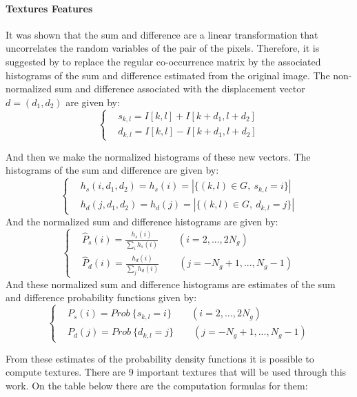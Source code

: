 \paragraph{Textures Features}
It was shown that the sum and difference are a linear transformation that uncorrelates the random variables of the pair of the pixels. Therefore, it is suggested by \cite{Unser} to replace the regular co-occurrence matrix by the associated histograms of the sum and difference estimated from the original image.
The non-normalized sum and difference associated with the displacement vector $d=(d_1,d_2)$ are given by:
\begin{equation}
\begin{cases}
&s_{k,l} = I[k,l] + I[k+d_1, l+d_2]\\
&d_{k,l} = I[k,l] - I[k+d_1, l+d_2]
\end{cases}
\end{equation}

And then we make the normalized histograms of these new vectors. The histograms of the sum and difference are given by:
\begin{equation}
\begin{cases}
&h_s(i, d_1, d_2) = h_s(i) = |\{(k,l) \in G, \ s_{k,l} = i\}|\\
&h_d(j, d_1, d_2) = h_d(j) = |\{(k,l) \in G, \ d_{k,l} = j\}|
\end{cases}
\end{equation}
And the normalized sum and difference histograms are given by:
\begin{equation}
\begin{cases}
&\hat{P}_s(i) = \frac{h_s(i)}{\sum_i h_s(i)} \qquad (i=2,...,2N_g)\\
&\hat{P}_d(i) = \frac{h_d(i)}{\sum_j h_d(i)} \qquad (j=-N_g+1, ... ,N_g-1)
\end{cases}
\end{equation}
And these normalized sum and difference histograms are estimates of the sum and difference probability functions given by:
\begin{equation}
\begin{cases}
&P_s(i) = Prob\  \{s_{k,l} = i\} \qquad (i=2,...,2N_g)\\
&P_d(j) = Prob\  \{d_{k,l} = j\} \qquad (j=-N_g+1, ... ,N_g-1)
\end{cases}
\end{equation}


From these estimates of the probability density functions it is possible to compute textures. There are 9 important textures that will be used through this work. On the table below there are the computation formulas for them:


